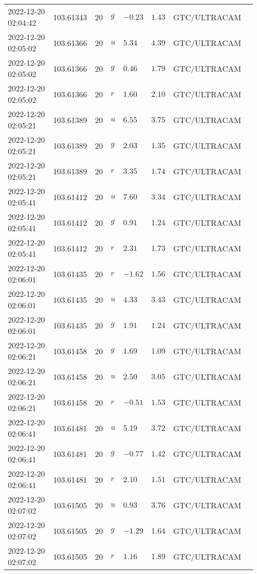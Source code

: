 \documentclass{nature_plusfigure}
\begin{document}
\begin{supplement}
\begin{center}
\begin{longtable}{llllllll}
2022-12-20 02:04:42 & 103.61343 & 20 & $g$ & $-0.23$ & $1.43$ & GTC/ULTRACAM &  \\ 
2022-12-20 02:05:02 & 103.61366 & 20 & $u$ & $5.34$ & $4.39$ & GTC/ULTRACAM &  \\ 
2022-12-20 02:05:02 & 103.61366 & 20 & $g$ & $0.46$ & $1.79$ & GTC/ULTRACAM &  \\ 
2022-12-20 02:05:02 & 103.61366 & 20 & $r$ & $1.60$ & $2.10$ & GTC/ULTRACAM &  \\ 
2022-12-20 02:05:21 & 103.61389 & 20 & $u$ & $6.55$ & $3.75$ & GTC/ULTRACAM &  \\ 
2022-12-20 02:05:21 & 103.61389 & 20 & $g$ & $2.03$ & $1.35$ & GTC/ULTRACAM &  \\ 
2022-12-20 02:05:21 & 103.61389 & 20 & $r$ & $3.35$ & $1.74$ & GTC/ULTRACAM &  \\ 
2022-12-20 02:05:41 & 103.61412 & 20 & $u$ & $7.60$ & $3.34$ & GTC/ULTRACAM &  \\ 
2022-12-20 02:05:41 & 103.61412 & 20 & $g$ & $0.91$ & $1.24$ & GTC/ULTRACAM &  \\ 
2022-12-20 02:05:41 & 103.61412 & 20 & $r$ & $2.31$ & $1.73$ & GTC/ULTRACAM &  \\ 
2022-12-20 02:06:01 & 103.61435 & 20 & $r$ & $-1.62$ & $1.56$ & GTC/ULTRACAM &  \\ 
2022-12-20 02:06:01 & 103.61435 & 20 & $u$ & $4.33$ & $3.43$ & GTC/ULTRACAM &  \\ 
2022-12-20 02:06:01 & 103.61435 & 20 & $g$ & $1.91$ & $1.24$ & GTC/ULTRACAM &  \\ 
2022-12-20 02:06:21 & 103.61458 & 20 & $g$ & $1.69$ & $1.09$ & GTC/ULTRACAM &  \\ 
2022-12-20 02:06:21 & 103.61458 & 20 & $u$ & $2.50$ & $3.05$ & GTC/ULTRACAM &  \\ 
2022-12-20 02:06:21 & 103.61458 & 20 & $r$ & $-0.51$ & $1.53$ & GTC/ULTRACAM &  \\ 
2022-12-20 02:06:41 & 103.61481 & 20 & $u$ & $5.19$ & $3.72$ & GTC/ULTRACAM &  \\ 
2022-12-20 02:06:41 & 103.61481 & 20 & $g$ & $-0.77$ & $1.42$ & GTC/ULTRACAM &  \\ 
2022-12-20 02:06:41 & 103.61481 & 20 & $r$ & $2.10$ & $1.51$ & GTC/ULTRACAM &  \\ 
2022-12-20 02:07:02 & 103.61505 & 20 & $u$ & $0.93$ & $3.76$ & GTC/ULTRACAM &  \\ 
2022-12-20 02:07:02 & 103.61505 & 20 & $g$ & $-1.29$ & $1.64$ & GTC/ULTRACAM &  \\ 
2022-12-20 02:07:02 & 103.61505 & 20 & $r$ & $1.16$ & $1.89$ & GTC/ULTRACAM &  \\ 

\end{longtable}
\end{center}
\end{supplement}
\end{document}
